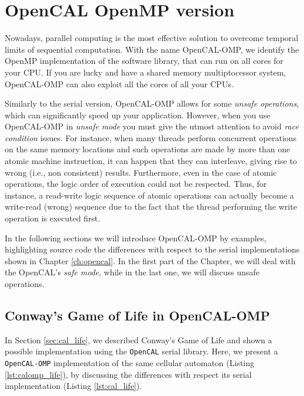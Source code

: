\chapter{OpenCAL OpenMP version}\label{ch:opencal-omp}

Nowadays, parallel computing is the most effective solution to
overcome temporal limits of sequential computation.  With the name
OpenCAL-OMP, we identify the OpenMP implementation of the software
library, that can run on all cores for your CPU. If you are lucky and
have a shared memory multiptocessor system, OpenCAL-OMP can also
exploit all the cores of all your CPUs.

Similarly to the serial version, OpenCAL-OMP allows for some
\emph{unsafe operations}, which can significantly speed up your
application. However, when you use OpenCAL-OMP in \emph{unsafe mode}
you must give the utmost attention to avoid\textsl{ race condition}
issues. For instance, when many threads perform concurrent operations
on the same memory locations and such operations are made by more than
one atomic machine instruction, it can happen that they can
interleave, giving rise to wrong (i.e., non consistent)
results. Furthermore, even in the case of atomic operations, the logic
order of execution could not be respected. Thus, for instance, a
read-write logic sequence of atomic operations can actually become a
write-read (wrong) sequence due to the fact that the thread performing
the write operation is executed first.

In the following sections we will introduce OpenCAL-OMP by examples,
highlighting source code the differences with respect to the serial
implementations shown in Chapter \ref{ch:opencal}. In the first part of
the Chapter, we will deal with the OpenCAL's \emph{safe mode}, while in
the last one, we will discuss unsafe operations.

\section{Conway's Game of Life in OpenCAL-OMP}

In Section \ref{sec:cal_life}, we described Conway's Game of Life and
shown a possible implementation using the \verb'OpenCAL' serial
library. Here, we present a \verb'OpenCAL-OMP' implementation of the
same cellular automaton (Listing \ref{lst:calomp_life}), by discussing
the differences with respect its serial implementation (Listing
\ref{lst:cal_life}).



